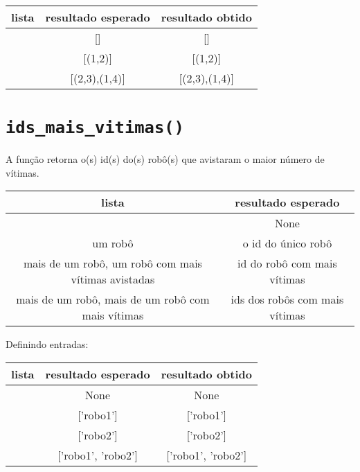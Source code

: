 \begin{apendicesenv}
\begin{center}
    \begin{tabular}{|c|c|c|}
        \cline{1-3}
        lista & resultado esperado & resultado obtido  \\ \hline
        [] & [] & [] \\ \hline
        [(1,2)] & [(1,2)] & [(1,2)] \\ \hline
        [(1,4),(2,3)] & [(2,3),(1,4)] & [(2,3),(1,4)] \\ \hline

    \end{tabular}
\end{center}


\section{\texttt{ids\_mais\_vitimas()}}
 A função retorna o(s) id(s) do(s) robô(s) que avistaram o maior número de vítimas.
 
 \begin{center}
    \begin{tabular}{|c|c|}
        \cline{1-2}
        lista & resultado esperado \\ \hline
        [] & None \\ \hline
        um robô  & o id do único robô \\ \hline
        mais de um robô, um robô com mais vítimas avistadas & id do robô com mais vítimas  \\ \hline
        mais de um robô, mais de um robô com mais vítimas & ids dos robôs com mais vítimas \\ \hline
    \end{tabular}
\end{center}

Definindo entradas:

\begin{center}
    \begin{tabular}{|c|c|c|}
        \cline{1-3}
        lista & resultado esperado & resultado obtido  \\ \hline
        [] & None & None \\ \hline
        [('robo1',1,(1,1),2)] & ['robo1'] & ['robo1'] \\ \hline
        [('robo1',1,(1,1),2),('robo2',5,(3,2),5)] & ['robo2'] & ['robo2'] \\ \hline
        [('robo1',1,(1,1),2),('robo2',5,(3,2),2)] & ['robo1', 'robo2'] & ['robo1', 'robo2'] \\ \hline
    \end{tabular}
\end{center} 

\end{apendicesenv}
